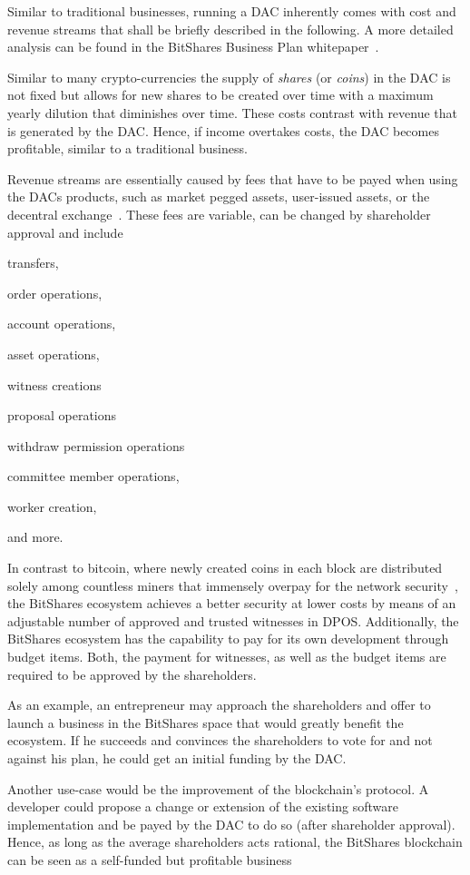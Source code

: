 \label{sec:token:supply}

Similar to traditional businesses, running a DAC inherently comes with cost and
revenue streams that shall be briefly described in the following. A more
detailed analysis can be found in the BitShares Business Plan
whitepaper~\cite{}.

Similar to many crypto-currencies the supply of \emph{shares} (or \emph{coins})
in the DAC is not fixed but allows for new shares to be created over time with
a maximum yearly dilution that diminishes over time. These costs contrast with
revenue that is generated by the DAC. Hence, if income overtakes costs, the DAC
becomes profitable, similar to a traditional business.

Revenue streams are essentially caused by fees that have to be payed when using
the DACs products, such as market pegged assets, user-issued assets, or the
decentral exchange~\cite{bts:financial}. These fees are variable, can be
changed by shareholder approval and include
\begin{inparaenum}[(a)]
 \item transfers,
 \item order operations,
 \item account operations,
 \item asset operations,
 \item witness creations
 \item proposal operations
 \item withdraw permission operations
 \item committee member operations,
 \item worker creation,
\end{inparaenum}
and more.

In contrast to bitcoin, where newly created coins in each block are distributed
solely among countless miners that immensely overpay for the network
security~\cite{ltb:dac}, the BitShares ecosystem achieves a better security at
lower costs by means of an adjustable number of approved and trusted witnesses
in DPOS. Additionally, the BitShares ecosystem has the capability to pay for
its own development through budget items. Both, the payment for witnesses, as
well as the budget items are required to be approved by the shareholders.

As an example, an entrepreneur may approach the shareholders and offer to
launch a business in the BitShares space that would greatly benefit the
ecosystem. If he succeeds and convinces the shareholders to vote for and not
against his plan, he could get an initial funding by the DAC.

Another use-case would be the improvement of the blockchain's protocol. A
developer could propose a change or extension of the existing software
implementation and be payed by the DAC to do so (after shareholder approval).
Hence, as long as the average shareholders acts rational, the BitShares
blockchain can be seen as a self-funded but profitable business
